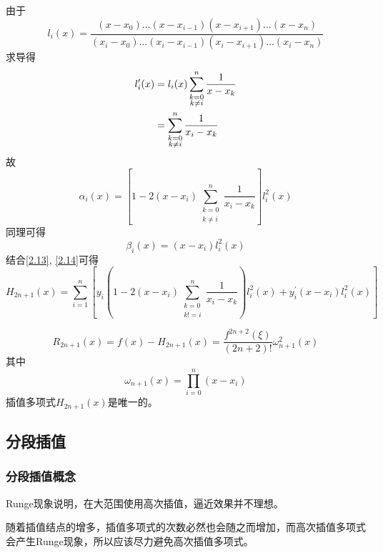 \documentclass[12pt]{report}
\numberwithin{equation}{section}
\begin{document}
	由于
	$$
	l_i(x) = \frac{(x - x_0)\ldots (x - x_{i-1})(x - x_{i+1})\ldots (x - x_n)}{(x_i - x_0)\ldots (x_i - x_{i-1})(x_i - x_{i+1})\ldots (x_i - x_n)}
	$$
	求导得
	\begin{equation}
		\notag
		\begin{aligned}
			l_{i}^\prime (x) &= l_i(x) \sum_{\substack{k=0  \\ k \neq i}}^n \frac{1}{x - x_k}  \\
			&= \sum_{\substack{k=0  \\ k \neq i}}^n \frac{1}{x_i - x_k}
		\end{aligned}
	\end{equation}
	故
	\begin{equation} \tag{2.13} \label{2.13}
		\alpha_i(x) = \left[1 - 2\left(x - x_i \right)\sum_{\substack{k=0 \\ k \neq i}}^n \frac{1}{x_i - x_k}\right]l_{i}^2 (x)
	\end{equation}
	同理可得
	\begin{equation} \tag{2.14} \label{2.14}
		\beta_i (x) = \left(x - x_i\right) l_{i}^2 (x) 
	\end{equation}
	结合\eqref{2.13}, \eqref{2.14}可得
	\begin{equation} \tag{2.15} \label{2.15}
		H_{2n+1}(x) = \sum_{i=1}^n\left[y_i \left(1 - 2\left(x - x_i\right) \sum_{\substack{k=0 \\ k!=i}}^n\frac{1}{x_i - x_k}\right)l_{i}^2 (x) + y_{i}^\prime (x - x_i)l_{i}^2 (x)\right]
	\end{equation}

	\begin{equation} \tag{2.16} \label{2.16}
		R_{2n+1}(x) = f(x) - H_{2n+1}(x) = \frac{f^{2n+2}(\xi)}{(2n+2)!}\omega_{n+1}^2(x)
	\end{equation}
	其中
	$$
	\omega_{n+1}(x) = \prod_{i=0}^n (x - x_i) 
	$$
	插值多项式$H_{2n+1}(x)$是唯一的。

	\subsection{分段插值}

	\subsubsection{分段插值概念}
	Runge现象说明，在大范围使用高次插值，逼近效果并不理想。

	随着插值结点的增多，插值多项式的次数必然也会随之而增加，而高次插值多项式会产生Runge现象，所以应该尽力避免高次插值多项式。
\end{document}
